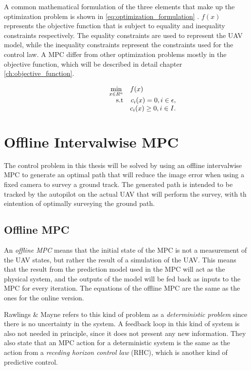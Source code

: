 A common mathematical formulation of the three elements that make up the optimization problem is shown in \ref{eq:optimization_formulation} \cite{nocedalOPTIMIZATION}. $f(x)$ represents the objective function that is subject to equality and inequality constraints respectively. The equality constraints are used to represent the UAV model, while the inequality constraints represent the constraints used for the control law. A MPC differ from other optimization problems mostly in the objective function, which will be described in detail chapter \ref{ch:objective_function}.

\begin{equation}
	\label{eq:optimization_formulation}
	\begin{array}{rrclcl}
		\displaystyle \min_{x \in R^n} & \multicolumn{3}{l}{f(x)} \\
		\textrm{s.t}
		& c_i(x) = 0, i \in \epsilon, \\
		& c_i(x) \geq 0, i \in I.
	\end{array}
\end{equation}


\section{Offline Intervalwise MPC}

The control problem in this thesis will be solved by using an offline intervalwise MPC to generate an optimal path that will reduce the image error when using a fixed camera to survey a ground track. The generated path is intended to be tracked by the autopilot on the actual UAV that will perform the survey, with th eintention of optimally surveying the ground path.

\subsection{Offline MPC} 

An \textit{offline MPC} means that the initial state of the MPC is not a measurement of the UAV states, but rather the result of a simulation of the UAV. This means that the result from the prediction model used in the MPC will act as the physical system, and the outputs of the model will be fed back as inputs to the MPC for every iteration. The equations of the offline MPC are the same as the ones for the online version.

Rawlings \& Mayne \cite{mpcMAYNE} refers to this kind of problem as a \textit{deterministic problem} since there is no uncertainty in the system. A feedback loop in this kind of system is also not needed in principle, since it does not present any new information. They also state that an MPC action for a deterministic system is the same as the action from a \textit{receding horizon control law} (RHC), which is another kind of predictive control.

